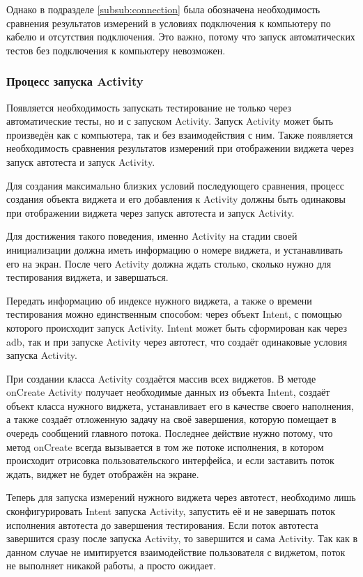 \documentclass[a4paper,14pt]{extarticle} %
\begin{document}
	Однако в подразделе \ref{subsub:connection} была обозначена необходимость сравнения результатов измерений в условиях подключения к компьютеру по кабелю и отсутствия подключения. Это важно, потому что запуск автоматических тестов без подключения к компьютеру невозможен. 
	
	\subsubsection{Процесс запуска Activity}\label{subsub:activity_start}
	
	Появляется необходимость запускать тестирование не только через автоматические тесты, но и с запуском Activity. Запуск Activity может быть произведён как с компьютера, так и без взаимодействия с ним. Также появляется необходимость сравнения результатов измерений при отображении виджета через запуск автотеста и запуск Activity.
	
	Для создания максимально близких условий последующего сравнения, процесс создания объекта виджета и его добавления к Activity должны быть одинаковы при отображении виджета через запуск автотеста и запуск Activity.
	
	Для достижения такого поведения, именно Activity на стадии своей инициализации должна иметь информацию о номере виджета, и устанавливать его на экран. После чего Activity должна ждать столько, сколько нужно для тестирования виджета, и завершаться. 
	
	Передать информацию об индексе нужного виджета, а также о времени тестирования можно единственным способом: через объект Intent, с помощью которого происходит запуск Activity. Intent может быть сформирован как через adb, так и при запуске Activity через автотест, что создаёт одинаковые условия запуска Activity.
	
	При создании класса Activity создаётся массив всех виджетов. В методе onCreate Activity получает необходимые данных из объекта Intent, создаёт объект класса нужного виджета, устанавливает его в качестве своего наполнения, а также создаёт отложенную задачу на своё завершения, которую помещает в очередь сообщений главного потока. Последнее действие нужно потому, что метод onCreate всегда вызывается в том же потоке исполнения, в котором происходит отрисовка пользовательского интерфейса, и если заставить поток ждать, виджет не будет отображён на экране.
	
	Теперь для запуска измерений нужного виджета через автотест, необходимо лишь сконфигурировать Intent запуска Activity, запустить её и не завершать поток исполнения автотеста до завершения тестирования. Если поток автотеста завершится сразу после запуска Activity, то завершится и сама Activity. Так как в данном случае не имитируется взаимодействие пользователя с виджетом, поток не выполняет никакой работы, а просто ожидает.
	
\end{document}

